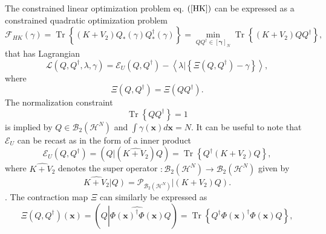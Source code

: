 \documentclass[aps,preprint]{revtex4}%
\begin{document}
The constrained linear optimization problem eq. $\left(  \ref{HK}\right)  $
can be expressed as a constrained quadratic optimization problem
\begin{equation}
\mathcal{F}_{HK}\left(  \gamma\right)  =\operatorname{Tr}\left\{  \overset
{}{\left(  K+V_{2}\right)  Q_{\ast}\left(  \gamma\right)  Q_{\ast}^{\dagger
}\left(  \gamma\right)  }\right\}  =\min_{QQ^{\dagger}\in\left[
\mathbf{\gamma}\right]  _{N}}\operatorname{Tr}\left\{  \overset{}{\left(
K+V_{2}\right)  QQ^{\dagger}}\right\}  ,
\end{equation}
that has Lagrangian
\begin{equation}
\mathcal{L}\left(  Q,Q^{\dagger},\lambda,\gamma\right)  =\mathcal{E}%
_{U}\left(  Q,Q^{\dagger}\right)  -\left\langle \left.  \lambda\right\vert
\left\{  \Xi\left(  Q,Q^{\dagger}\right)  -\gamma\right\}  \right\rangle ,
\end{equation}
where
\begin{equation}
\Xi\left(  Q,Q^{\dagger}\right)  =\Xi\left(  QQ^{\dagger}\right)  .
\end{equation}
The normalization constraint
\begin{equation}
\operatorname{Tr}\left\{  QQ^{\dagger}\right\}  =1
\end{equation}
is implied by $Q\in\mathcal{B}_{2}\left(  \mathcal{H}^{N}\right)  $ and
$\int\gamma\left(  \mathbf{x}\right)  d\mathbf{x}=N.$ It can be useful to note
that $\mathcal{E}_{U}$ can be recast as in the form of a inner product
\begin{equation}
\mathcal{E}_{U}\left(  Q,Q^{\dagger}\right)  =\left(  \left.  Q\right\vert
\left(  \widehat{K+V_{2}}\right)  Q\right)  =\operatorname{Tr}\left\{
Q^{\dagger}\left(  K+V_{2}\right)  Q\right\}  ,
\end{equation}
where $\widehat{K+V_{2}}$ denotes the super operator $:\mathcal{B}_{2}\left(
\mathcal{H}^{N}\right)  \rightarrow\mathcal{B}_{2}\left(  \mathcal{H}%
^{N}\right)  $ given by
\begin{equation}
\widehat{K+V_{2}}\left\vert Q\right)  =\mathcal{P}_{\mathcal{B}_{2}\left(
\mathcal{H}^{N}\right)  }\left\vert \left(  K+V_{2}\right)  Q\right)  .
\end{equation}
$.$ The contraction map $\Xi$ can similarly be expressed as
\begin{equation}
\Xi\left(  Q,Q^{\dagger}\right)  \left(  \mathbf{x}\right)  =\left(
Q\left\vert \widehat{\Phi\left(  \mathbf{x}\right)  ^{\dagger}\Phi\left(
\mathbf{x}\right)  }\right.  Q\right)  =\operatorname{Tr}\left\{  Q^{\dagger
}\Phi\left(  \mathbf{x}\right)  ^{\dagger}\Phi\left(  \mathbf{x}\right)
Q\right\}  ,
\end{equation}
\end{document}

